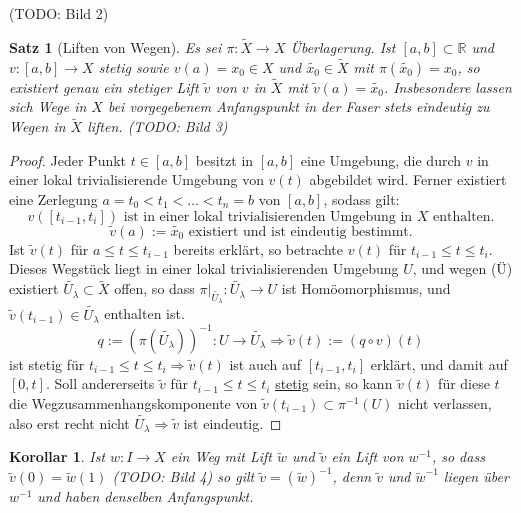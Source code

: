 \documentclass[a4paper,11pt,notitlepage]{report}
\newtheorem{theorem}{Satz}[chapter]
\newtheorem{corollary}{Korollar}[chapter]
\theoremstyle{remark}
\theoremstyle{definition}
\newcommand{\R}{{\ensuremath{\mathbb{R}}}}
\begin{document}
(TODO: Bild 2)

\begin{theorem}[Liften von Wegen]
	Es sei $\pi \colon \widetilde{X} \rightarrow X$ Überlagerung. 
	\newline
	Ist $[a,b] \subset \R$ und $v \colon [a,b] \rightarrow X$ stetig sowie
	$v(a)=x_0 \in X$ und $\widetilde{x_0} \in \widetilde{X}$ mit $\pi(\widetilde{x_0}) = x_0$, so existiert genau ein stetiger Lift $\widetilde{v}$ von $v$ in $\widetilde{X}$ mit $\widetilde{v}(a) = \widetilde{x_0}$.
	Insbesondere lassen sich Wege in $X$ bei vorgegebenem Anfangspunkt in der Faser stets eindeutig zu Wegen in $\widetilde{X}$ liften.
	(TODO: Bild 3)
\end{theorem}

\begin{proof}
	Jeder Punkt $t \in [a,b]$ besitzt in $[a,b]$ eine Umgebung, die durch $v$ in einer lokal trivialisierende Umgebung von $v(t)$ abgebildet wird. Ferner existiert eine Zerlegung $a = t_0 < t_1 < \ldots < t_n = b$ von $[a,b]$, sodass gilt:
	$$v([t_{i-1}, t_i]) \text{ ist in einer lokal trivialisierenden Umgebung in $X$ enthalten.}$$
	$$\widetilde{v}(a):= \widetilde{x_0} \text{ existiert und ist eindeutig bestimmt.}$$
	Ist $\widetilde{v}(t)$ für $a \leq t \leq t_{i-1}$ bereits erklärt, so betrachte $v(t)$ für $t_{i-1} \leq t \leq t_i$. Dieses Wegstück liegt in einer lokal trivialisierenden Umgebung $U$, und wegen (Ü) existiert $\widetilde{U_\lambda} \subset \widetilde{X}$ offen, so dass $\pi \big |_{\widetilde{U_\lambda}} \colon \widetilde{U_\lambda} \rightarrow U$ ist Homöomorphismus, und $\widetilde{v}(t_{i-1}) \in \widetilde{U_\lambda}$ enthalten ist.
	$$q := (\pi(\widetilde{U_\lambda}))^{-1} \colon U \rightarrow \widetilde{U_\lambda} \Rightarrow \widetilde{v}(t) := (q \circ v)(t)$$
	ist stetig für $t_{i-1} \leq t \leq t_i \Rightarrow \widetilde{v}(t)$ ist auch auf $[t_{i-1},t_i]$ erklärt, und damit auf $[0,t]$.
	\newline
	Soll andererseits $\widetilde{v}$ für $t_{i-1} \leq t \leq t_i$ \underline{stetig} sein, so kann $\widetilde{v}(t)$ für diese $t$ die Wegzusammenhangskomponente von $\widetilde{v}(t_{i-1}) \subset \pi^{-1}(U)$ nicht verlassen, also erst recht nicht $\widetilde{U_\lambda} \Rightarrow \widetilde{v}$ ist eindeutig.
\end{proof}

\begin{corollary}
	Ist $w \colon I \rightarrow X$ ein Weg mit Lift $\widetilde{w}$ und $\widetilde{v}$ ein Lift von $w^{-1}$, so dass $\widetilde{v}(0) = \widetilde{w}(1)$ (TODO: Bild 4)
	so gilt $\widetilde{v} = (\widetilde{w})^{-1}$, denn $\widetilde{v}$ und $\widetilde{w}^{-1}$ liegen über $w^{-1}$ und haben denselben Anfangspunkt.
\end{corollary}
\end{document}
